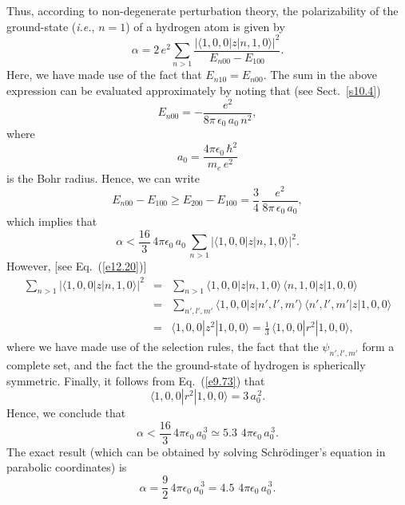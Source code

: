 Thus, according to non-degenerate perturbation theory, the polarizability of the ground-state  ({\em i.e.}, $n=1$) of a hydrogen atom is given by
\begin{equation}
\alpha = 2\,e^2\sum_{n>1}\frac{|\langle 1,0,0|z|n,1,0\rangle|^2}{E_{n00}-E_{100}}.
\end{equation}
Here, we have made use of the fact that $E_{n10}=E_{n00}$. The sum in the above expression can be
evaluated approximately by noting that (see Sect.~\ref{s10.4})
\begin{equation}
E_{n00} = -\frac{e^2}{8\pi\,\epsilon_0\,a_0\,n^2},
\end{equation}
where
\begin{equation}
a_0 = \frac{4\pi\epsilon_0\,\hbar^2}{m_e\,e^2}
\end{equation}
is the Bohr radius. Hence, we can write
\begin{equation}
E_{n00}-E_{100} \geq E_{200}-E_{100} = \frac{3}{4}\,\frac{e^2}{8\pi\,\epsilon_0\,a_0},
\end{equation}
which implies that
\begin{equation}
\alpha < \frac{16}{3}\,4\pi\epsilon_0\,a_0\,\sum_{n>1}
|\langle 1,0,0|z|n,1,0\rangle|^2.
\end{equation}
However, [see Eq.~(\ref{e12.20})]
\begin{eqnarray}
\sum_{n>1}|\langle 1,0,0|z|n,1,0\rangle|^2
&=& \sum_{n>1}\langle 1,0,0|z|n,1,0\rangle\,\langle n,1,0|z|1,0,0\rangle\nonumber\\[0.5ex]
&=&\sum_{n',l',m'}\langle 1,0,0|z|n',l',m'\rangle\,\langle n',l',m'|z|1,0,0\rangle\nonumber\\[0.5ex]
&=&\langle 1,0,0|z^2|1,0,0\rangle = \frac{1}{3}\,\langle 1,0,0|r^2|1,0,0\rangle,
\end{eqnarray}
where we have made use of the selection rules,  the fact that the
$\psi_{n',l',m'}$ form a complete set, and the fact the the
ground-state of hydrogen is spherically symmetric. Finally, it
follows from Eq.~(\ref{e9.73}) that
\begin{equation}
\langle 1,0,0|r^2|1,0,0\rangle = 3\,a_0^{\,2}.
\end{equation}
Hence, we conclude that
\begin{equation}
\alpha < \frac{16}{3}\,4\pi\epsilon_0\,a_0^{\,3}\simeq 5.3\,\,4\pi\epsilon_0\,a_0^{\,3}.
\end{equation}
The exact result (which can be obtained by solving Schr\"{o}dinger's equation
in parabolic coordinates) is
\begin{equation}
\alpha = \frac{9}{2}\,4\pi\epsilon_0\,a_0^{\,3} = 4.5\,\,4\pi\epsilon_0\,a_0^{\,3}.
\end{equation}

